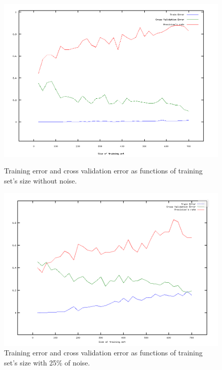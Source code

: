 \documentclass[a4paper, 11pt]{article}
\begin{document}
\begin{figure}[t]
  \centering
  \includegraphics[scale=0.45]{1}
  \caption{Training error and cross validation error as functions of training set's size without noise.}
  \label{fig:m1}
  \includegraphics[scale=0.45]{2}
  \caption{Training error and cross validation error as functions of training set's size with 25\% of noise.}
  \label{fig:m2}
\end{figure}
\end{document}
